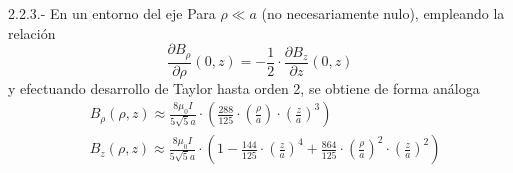 \documentclass{beamer}
\begin{document}
\begin{frame}{2.2.3.- En un entorno del eje}
    Para $\rho \ll a$ (no necesariamente nulo), empleando la relación
    \begin{equation}
        \frac{\partial B_{\rho}}{\partial \rho} (0,z) = - \frac{1}{2} \cdot \frac{\partial B_{z}}{\partial z} (0,z) \nonumber
    \end{equation}
    \pause y efectuando desarrollo de Taylor hasta orden 2, se obtiene de forma análoga
    \begin{align*}
        & B_{\rho}(\rho,z) \approx  \frac{8 \mu_{0} I}{5 \sqrt{5} a} \cdot \left(\frac{288}{125} \cdot \left( \frac{\rho}{a} \right) \cdot \left( \frac{z}{a} \right)^{3} \right)\nonumber \\
        & B_{z}(\rho,z) \approx \frac{8 \mu_{0} I}{5 \sqrt{5} a} \cdot \left( 1 - \frac{144}{125} \cdot \left( \frac{z}{a} \right)^{4} + \frac{864}{125} \cdot \left( \frac{\rho}{a} \right)^{2} \cdot \left( \frac{z}{a} \right)^{2} \right)
    \end{align*}
\end{frame}
\end{document}
